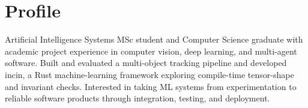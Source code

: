 \section{Profile}

Artificial Intelligence Systems MSc student and Computer Science graduate with academic project experience in computer vision, deep learning, and multi-agent software. Built and evaluated a multi-object tracking pipeline and developed incin, a Rust machine-learning framework exploring compile-time tensor-shape and invariant checks. Interested in taking ML systems from experimentation to reliable software products through integration, testing, and deployment.
